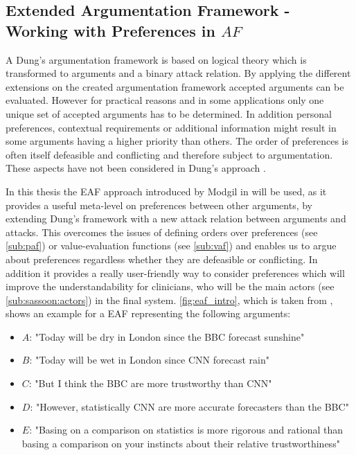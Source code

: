 \subsection{Extended Argumentation Framework - Working with Preferences in $AF$}

A Dung's argumentation framework is based on logical theory which is transformed to arguments and a binary attack relation. By applying the different extensions on the created argumentation framework accepted arguments can be evaluated. 
However for practical reasons and in some applications only one unique set of accepted arguments has to be determined. In addition personal preferences, contextual requirements or additional information might result in some arguments having a higher priority than others. The order of preferences is often itself defeasible and conflicting and therefore subject to argumentation. These aspects have not been considered in Dung's approach \cite{Modgil2009}.



In this thesis the \gls{EAF} approach introduced by Modgil in \cite{Modgil2009} will be used, as it provides a useful meta-level on preferences between other arguments, by extending Dung's framework with a new attack relation between arguments and attacks. This overcomes the issues of defining orders over preferences (see \autoref{sub:paf}) or value-evaluation functions (see \autoref{sub:vaf}) and enables us to argue about preferences regardless whether they are defeasible or conflicting. In addition it provides a really user-friendly way to consider preferences which will improve the understandability for clinicians, who will be the main actors (see \autoref{sub:sassoon:actors}) in the final system.
\autoref{fig:eaf_intro}, which is taken from \cite{Modgil2009}, shows an example for a \gls{EAF} representing the following arguments:

\begin{itemize}
	\item $A$: "Today will be dry in London since the BBC forecast sunshine"
	\item $B$: "Today will be wet in London since CNN forecast rain"
	\item $C$: "But I think the BBC are more trustworthy than CNN"
	\item $D$: "However, statistically CNN are more accurate forecasters than the BBC"
	\item $E$: "Basing on a comparison on statistics is more rigorous and rational than basing a comparison on your instincts about their relative trustworthiness"
\end{itemize}


